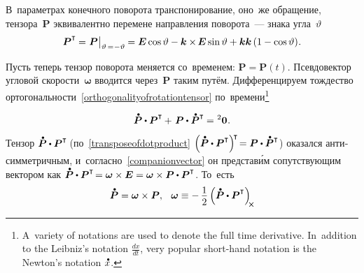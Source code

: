 \begin{otherlanguage}{russian}
\vspace{-0.16em} В~параметрах конечного поворота транспонирование, оно~же обращение, тензора~$\bm{P}$ эквивалентно перемене направления поворота~--- знака угла~$\vartheta$
\[
\bm{P}^{\T} \hspace{-0.1ex}=\hspace{0.1ex} \bm{P} \hspace{0.1ex} \bigr|_{\vartheta \,=\hspace{0.1ex} -\vartheta} \hspace{-0.1ex} = \bm{E} \operatorname{cos} \vartheta - \bm{k} \times\hspace{-0.2ex} \bm{E} \operatorname{sin} \vartheta + \bm{k} \bm{k} \left({1 - \operatorname{cos} \vartheta}\right) \hspace{-0.32ex}.
\]

Пусть теперь тензор поворота меняется со~временем: ${\bm{P} \!=\! \bm{P}(t)}$.
Псевдовектор угловой скорости~${\bm{\omega}}$ вводится через~$\bm{P}$ таким путём.
Дифференцируем тождество ортогональности~\eqref{orthogonalityofrotationtensor} по~времени\footnote{A~variety of notations are used to denote the full time derivative. In~addition to the Leibniz’s notation ${\frac{dx}{dt}}$, very popular short-hand notation is the  Newton’s notation ${\mathdotabove{x}}$.}

\nopagebreak\vspace{-0.1em}\begin{equation*}
\mathdotabove{\bm{P}} \dotp \bm{P}^{\T} \hspace{-0.1ex} + \hspace{0.25ex} \bm{P} \dotp \mathdotabove{\bm{P}}^{\T} \hspace{-0.1ex} = \hspace{0.1ex} {^2\bm{0}}
\hspace{.1ex} .
\end{equation*}

Тензор ${\mathdotabove{\bm{P}} \dotp \bm{P}^{\T\!}}$ (по~\eqref{transposeofdotproduct} ${\left({ \mathdotabove{\bm{P}} \dotp \bm{P}^{\T} }\right)^{\raisemath{-0.25em}{\!\T}} \hspace{-0.36ex} = \bm{P} \dotp \mathdotabove{\bm{P}}^{\T}}$) оказался анти\-сим\-метрич\-ным, и~согласно~\eqref{companionvector} он представ\'{и}м сопутствующим вектором как ${\mathdotabove{\bm{P}} \dotp \bm{P}^{\T\!} = \bm{\omega} \times \bm{E} = \bm{\omega} \times \bm{P} \dotp \bm{P}^{\T}}$\!. То~есть
\vspace{0.1em}\begin{equation}\label{angularvelocityvector}
\mathdotabove{\bm{P}} = \bm{\omega} \times \bm{P}, \;\:\:
\bm{\omega} \equiv -\, \displaystyle \onehalf \left( \mathdotabove{\bm{P}} \dotp \bm{P}^{\T} \right)_{\hspace{-0.2em}\Xcompanion}
\vspace{-0.25em}\end{equation}


\end{otherlanguage}
